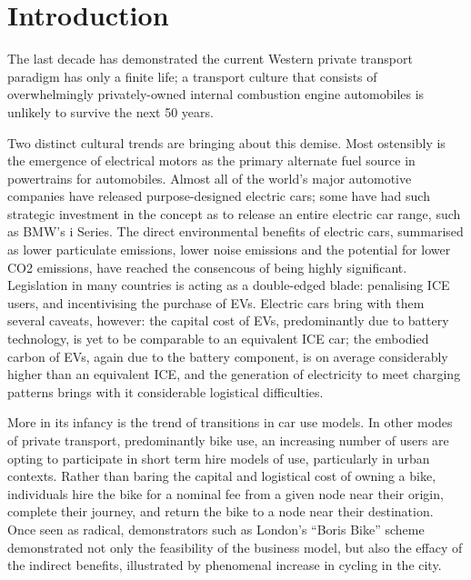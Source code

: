 \documentclass[conference]{IEEEtran}
\begin{document}

\section{Introduction}

The last decade has demonstrated the current Western private transport
paradigm has only a finite life; a transport culture that consists of
overwhelmingly privately-owned internal combustion engine automobiles
is unlikely to survive the next 50 years.

Two distinct cultural trends are bringing about this demise. Most
ostensibly is the emergence of electrical motors as the primary
alternate fuel source in powertrains for automobiles. Almost all of
the world’s major automotive companies have released purpose-designed
electric cars; some have had such strategic investment in the concept
as to release an entire electric car range, such as BMW's i
Series. The direct environmental benefits of electric cars, summarised
as lower particulate emissions, lower noise emissions and the
potential for lower CO2 emissions, have reached the consencous of
being highly significant. Legislation in many countries is acting as a
double-edged blade: penalising ICE users, and incentivising the
purchase of EVs. Electric cars bring with them several caveats,
however: the capital cost of EVs, predominantly due to battery
technology, is yet to be comparable to an equivalent ICE car; the
embodied carbon of EVs, again due to the battery component, is on
average considerably higher than an equivalent ICE, and the generation
of electricity to meet charging patterns brings with it considerable
logistical difficulties.

More in its infancy is the trend of transitions in car use models. In
other modes of private transport, predominantly bike use, an
increasing number of users are opting to participate in short term
hire models of use, particularly in urban contexts. Rather than baring
the capital and logistical cost of owning a bike, individuals hire the
bike for a nominal fee from a given node near their origin, complete
their journey, and return the bike to a node near their
destination. Once seen as radical, demonstrators such as London’s
``Boris Bike'' scheme demonstrated not only the feasibility of the
business model, but also the effacy of the indirect benefits,
illustrated by phenomenal increase in cycling in the city. 
\end{document}
